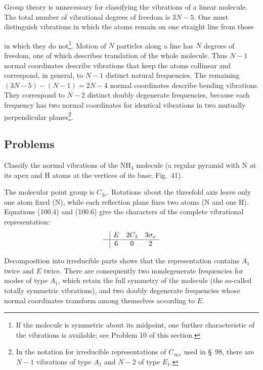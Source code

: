 Group theory is unnecessary for classifying the vibrations of a linear molecule. The total number of vibrational degrees of freedom is $3N-5$. One must distinguish vibrations in which the atoms remain on one straight line from those

in which they do not\footnote{If the molecule is symmetric about its midpoint, one further characteristic of the vibrations is available; see Problem 10 of this section.}. Motion of $N$ particles along a line has $N$ degrees of freedom, one of which describes translation of the whole molecule. Thus $N-1$ normal coordinates describe vibrations that keep the atoms collinear and correspond, in general, to $N-1$ distinct natural frequencies. The remaining $(3N-5)-(N-1)=2N-4$ normal coordinates describe bending vibrations. They correspond to $N-2$ distinct doubly degenerate frequencies, because each frequency has two normal coordinates for identical vibrations in two mutually perpendicular planes\footnote{In the notation for irreducible representations of $C_{\infty v}$ used in \S~98, there are $N-1$ vibrations of type $A_1$ and $N-2$ of type $E_1$.}.

\subsection*{Problems}

 Classify the normal vibrations of the $\mathrm{NH_3}$ molecule (a regular pyramid with N at its apex and H atoms at the vertices of its base; Fig.~41).

\SolutionHeading The molecular point group is $C_{3v}$. Rotations about the threefold axis leave only one atom fixed (N), while each reflection plane fixes two atoms (N and one H). Equations (100.4) and (100.6) give the characters of the complete vibrational representation:
\[
\begin{array}{c|ccc} &E&2C_3&3\sigma_v\\\hline &6&0&2\end{array}
\]
\begin{figure}[ht]
\centering
{}
\caption{}
\end{figure}
Decomposition into irreducible parts shows that the representation contains $A_1$ twice and $E$ twice. There are consequently two nondegenerate frequencies for modes of type $A_1$, which retain the full symmetry of the molecule (the so-called totally symmetric vibrations), and two doubly degenerate frequencies whose normal coordinates transform among themselves according to $E$.

